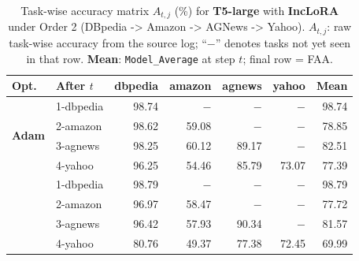 \begin{table}[ht]
\centering
\caption{%
  Task-wise accuracy matrix $A_{t,j}$ (\%) for \textbf{T5-large} with \textbf{IncLoRA} under Order 2 (DBpedia -> Amazon -> AGNews -> Yahoo).
  $A_{t,j}$: raw task-wise accuracy from the source log; ``$-$'' denotes tasks not yet seen in that row.
  \textbf{Mean}: \texttt{Model\_Average} at step $t$; final row = FAA.
}
\label{tab:nlp_o2_t5large_inclora}
\setlength{\tabcolsep}{4.0pt}
\renewcommand{\arraystretch}{0.92}
\scriptsize
\begin{tabular}{@{}l l r r r r r@{}}
\toprule
\textbf{Opt.} & \textbf{After $t$} & \textbf{dbpedia} & \textbf{amazon} & \textbf{agnews} & \textbf{yahoo} & \textbf{Mean} \\
\midrule
\multirow{4}{*}{\textbf{Adam}} & 1-dbpedia & 98.74 & $-$ & $-$ & $-$ & 98.74 \\
 & 2-amazon & 98.62 & 59.08 & $-$ & $-$ & 78.85 \\
 & 3-agnews & 98.25 & 60.12 & 89.17 & $-$ & 82.51 \\
 & 4-yahoo & 96.25 & 54.46 & 85.79 & 73.07 & 77.39 \\
\addlinespace[2pt]
\multirow{4}{*}{\textbf{SAM}} & 1-dbpedia & 98.79 & $-$ & $-$ & $-$ & 98.79 \\
 & 2-amazon & 96.97 & 58.47 & $-$ & $-$ & 77.72 \\
 & 3-agnews & 96.42 & 57.93 & 90.34 & $-$ & 81.57 \\
 & 4-yahoo & 80.76 & 49.37 & 77.38 & 72.45 & 69.99 \\
\bottomrule
\end{tabular}
\end{table}


